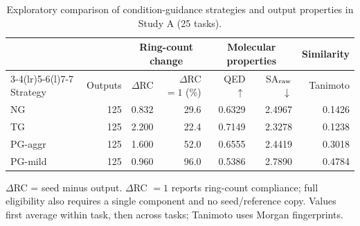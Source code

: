 \begin{table}[H]
\centering\small
\caption{Exploratory comparison of condition-guidance strategies and output properties in Study A (25 tasks).}
\label{tab:historical_strategies}
\setlength{\tabcolsep}{3.5pt}
\renewcommand{\arraystretch}{1.12}
\begin{tabular*}{\linewidth}{@{\extracolsep{\fill}}lrrrrrr@{}}
\toprule
 & & \multicolumn{2}{c}{Ring-count change} & \multicolumn{2}{c}{Molecular properties} & Similarity \\
\cmidrule(lr){3-4}\cmidrule(lr){5-6}\cmidrule(l){7-7}
Strategy & Outputs & $\Delta$RC & $\Delta$RC $=1$ (\%) & QED $\uparrow$ & SA$_{\rm raw}$ $\downarrow$ & Tanimoto \\
\midrule
NG & 125 & 0.832 & 29.6 & 0.6329 & 2.4967 & 0.1426 \\
TG & 125 & 2.200 & 22.4 & 0.7149 & 2.3278 & 0.1238 \\
PG-aggr & 125 & 1.600 & 52.0 & 0.6555 & 2.4419 & 0.3018 \\
PG-mild & 125 & 0.960 & 96.0 & 0.5386 & 2.7890 & 0.4784 \\
\bottomrule
\end{tabular*}
\par\smallskip
\begin{minipage}{\linewidth}\footnotesize
$\Delta$RC = seed minus output. $\Delta$RC $=1$ reports ring-count compliance; full eligibility also requires a single component and no seed/reference copy. Values first average within task, then across tasks; Tanimoto uses Morgan fingerprints.
\end{minipage}
\end{table}
